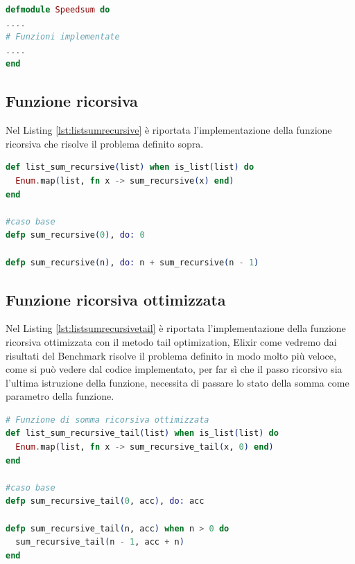 \begin{lstlisting}[language=elixir,captionpos=b,
	caption={Modulo di riferimento},
	label={lst:speedSum}]
defmodule Speedsum do
....
# Funzioni implementate
....
end


\end{lstlisting}


\subsection{Funzione ricorsiva}
Nel Listing \ref{lst:listsumrecursive} è riportata l'implementazione
della funzione ricorsiva che risolve il problema definito sopra.

\begin{lstlisting}[language=elixir,captionpos=b,
	caption={Funzione list\_sum\_recursive()},
	label={lst:listsumrecursive}]
def list_sum_recursive(list) when is_list(list) do
  Enum.map(list, fn x -> sum_recursive(x) end)
end

#caso base
defp sum_recursive(0), do: 0

defp sum_recursive(n), do: n + sum_recursive(n - 1)
\end{lstlisting}

\subsection{Funzione ricorsiva ottimizzata}
Nel Listing \ref{lst:listsumrecursivetail} è riportata l'implementazione
della funzione ricorsiva ottimizzata con il metodo tail optimization,
Elixir come vedremo dai risultati del Benchmark risolve il problema
definito in modo molto più veloce, come si può vedere dal codice
implementato, per far sì che il passo ricorsivo sia l'ultima
istruzione della funzione, necessita di passare lo stato della
somma come parametro della funzione.

\begin{lstlisting}[language=elixir,captionpos=b,
	caption={Funzione list\_sum\_recursive\_tail()},
	label={lst:listsumrecursivetail}]
# Funzione di somma ricorsiva ottimizzata
def list_sum_recursive_tail(list) when is_list(list) do
  Enum.map(list, fn x -> sum_recursive_tail(x, 0) end)
end
  
#caso base
defp sum_recursive_tail(0, acc), do: acc

defp sum_recursive_tail(n, acc) when n > 0 do
  sum_recursive_tail(n - 1, acc + n)
end
\end{lstlisting}

